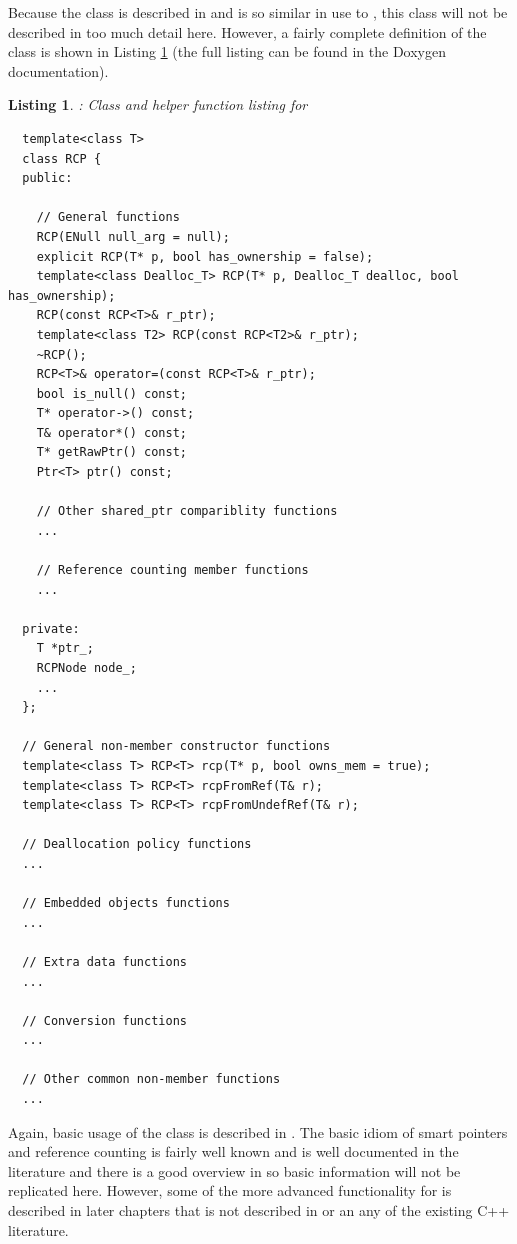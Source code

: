 \documentclass[pdf,ps2pdf,11pt]{SANDreport}
\newtheorem{listing}{Listing}
\begin{document}
Because the class {} is described in
{}\cite{RefCountPtrBeginnersGuide} and is so similar in use to
{}, this class will not be described in too
much detail here.  However, a fairly complete definition of the class
{} is shown in Listing {}\ref{listing:RCP} (the full
listing can be found in the Doxygen documentation).

\begin{listing}: Class and helper function listing for {} \\
\label{listing:RCP}
{\small\begin{verbatim}
  template<class T>
  class RCP {
  public:

    // General functions
    RCP(ENull null_arg = null);
    explicit RCP(T* p, bool has_ownership = false);
    template<class Dealloc_T> RCP(T* p, Dealloc_T dealloc, bool has_ownership);
    RCP(const RCP<T>& r_ptr);
    template<class T2> RCP(const RCP<T2>& r_ptr);
    ~RCP();
    RCP<T>& operator=(const RCP<T>& r_ptr);
    bool is_null() const;
    T* operator->() const;
    T& operator*() const;
    T* getRawPtr() const;
    Ptr<T> ptr() const;
  
    // Other shared_ptr compariblity functions
    ...
  
    // Reference counting member functions
    ...
  
  private:
    T *ptr_;
    RCPNode node_;
    ...
  };

  // General non-member constructor functions
  template<class T> RCP<T> rcp(T* p, bool owns_mem = true);
  template<class T> RCP<T> rcpFromRef(T& r);
  template<class T> RCP<T> rcpFromUndefRef(T& r);

  // Deallocation policy functions
  ...

  // Embedded objects functions
  ...

  // Extra data functions
  ...
 
  // Conversion functions
  ...

  // Other common non-member functions
  ...

\end{verbatim}}
\end{listing}

Again, basic usage of the {} class is described in
{}\cite{RefCountPtrBeginnersGuide}.  The basic idiom of smart pointers and
reference counting is fairly well known and is well documented in the
literature and there is a good overview in {}\cite{RefCountPtrBeginnersGuide}
so basic information will not be replicated here.  However, some of the more
advanced functionality for {} is described in later chapters that
is not described in {}\cite{RefCountPtrBeginnersGuide} or an any of the
existing C++ literature.
\end{document}
